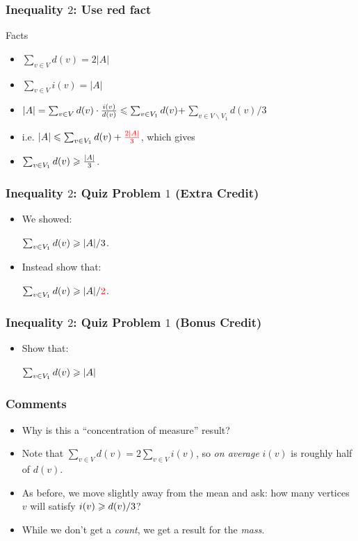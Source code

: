 \documentclass{beamer}
\begin{document}
\begin{frame}
\frametitle{Inequality $2$: Use {\color{red} red} fact}
\begin{block}{Facts}
\begin{itemize}
\item {\color{red} $\sum_{v\in V} d(v) = 2|A|$}
\item {\color{blue} $\sum_{v \in V} i(v) = |A|$}
\end{itemize}
\end{block}
\begin{itemize}
\item {\color{blue} $|A| = \sum_{v \in V} d(v)\cdot\frac{i(v)}{d(v)} \leqslant \sum_{v \in V_1} d(v) +$}{\color{red}$ \sum_{v\in V\backslash V_1} d(v)/3$}
\item i.e. $|A| \leqslant \sum_{v \in V_1} d(v) + {\color{red} \frac{2|A|}{3}}$, which gives
\item $\sum_{v \in V_1} d(v) \geqslant \frac{|A|}{3}$.
\end{itemize}
\end{frame}

\begin{frame}
\frametitle{Inequality $2$: Quiz Problem $1$ (Extra Credit) }
\begin{itemize}
\item We showed: 
\begin{center}
$\sum_{v \in V_1} d(v) \geqslant |A|/3$.
\end{center}
\pause
\item Instead show that: 
\begin{center}
$\sum_{v \in V_1} d(v) \geqslant |A|/{\color{red} 2}$. 
\end{center}
\end{itemize}
\end{frame}


\begin{frame}
\frametitle{Inequality $2$: Quiz Problem $1$ (Bonus Credit)}
\begin{itemize}
\item Show that: 
\begin{center}
$\sum_{v \in V_1} d(v) \geqslant |A|$
\end{center}
\end{itemize}
\end{frame}


\begin{frame}
\frametitle{Comments}
\begin{itemize}
\item Why is this a ``concentration of measure'' result?
\item Note that $\sum_{v \in V} d(v) = 2\sum_{v \in V} i(v)$, so {\em on average}
$i(v)$ is roughly {\color{red} half} of $d(v)$. 
\item As before, we move slightly away from the mean and ask: how many vertices $v$
will satisfy $i(v) \geqslant d(v)/3$? 
\item While we don't get a {\em count}, we get a result for the {\em mass}. 
\end{itemize}
\end{frame}
\end{document}
